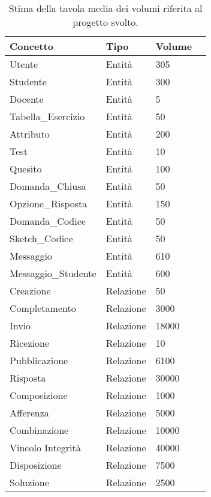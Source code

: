 \documentclass{article}
\begin{document}
\begin{table}[h]
    \centering
    \begin{tabularx}{\textwidth}{|X|X|X|X|}
        \hline
        \bf Concetto & \bf Tipo & \bf Volume \\
        \hline
        Utente & Entità & 305 \\
        \hline
        Studente & Entità & 300 \\
        \hline
        Docente & Entità & 5 \\
        \hline
        Tabella\_Esercizio & Entità & 50 \\
        \hline
        Attributo & Entità & 200 \\
        \hline
        Test & Entità & 10 \\
        \hline
        Quesito & Entità & 100 \\
        \hline
        Domanda\_Chiusa & Entità & 50 \\
        \hline
        Opzione\_Risposta & Entità & 150 \\
        \hline
        Domanda\_Codice & Entità & 50 \\
        \hline
        Sketch\_Codice & Entità & 50 \\
        \hline
        Messaggio & Entità & 610 \\
        \hline
        Messaggio\_Studente & Entità & 600 \\
        \hline
        Creazione & Relazione & 50 \\
        \hline
        Completamento & Relazione & 3000 \\
        \hline
        Invio & Relazione & 18000 \\
        \hline
        Ricezione & Relazione & 10 \\
        \hline
        Pubblicazione & Relazione & 6100 \\
        \hline
        Risposta & Relazione & 30000 \\
        \hline
        Composizione & Relazione & 1000 \\
        \hline
        Afferenza & Relazione & 5000 \\
        \hline
        Combinazione & Relazione & 10000 \\
        \hline
        Vincolo Integrità & Relazione & 40000 \\
        \hline
        Disposizione & Relazione & 7500 \\
        \hline
        Soluzione & Relazione & 2500 \\
        \hline
    \end{tabularx}
    \caption{Stima della tavola media dei volumi riferita al progetto svolto.}
\end{table}
\end{document}
